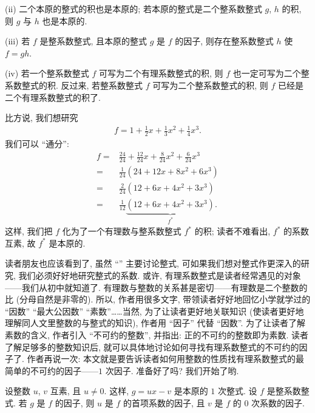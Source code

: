 (ii) 二个本原的整式的积也是本原的; 若本原的整式是二个整系数整式 $g$, $h$ 的积, 则 $g$ 与 $h$ 也是本原的.

(iii) 若 $f$ 是整系数整式, 且本原的整式 $g$ 是 $f$ 的因子, 则存在整系数整式 $h$ 使 $f = gh$.

(iv) 若一个整系数整式 $f$ 可写为二个有理系数整式的积, 则 $f$ 也一定可写为二个整系数整式的积. 反过来, 若整系数整式 $f$ 可写为二个整系数整式的积, 则 $f$ 已经是二个有理系数整式的积了.

比方说, 我们想研究
\begin{align*}
    f = 1 + \frac{1}{2}x + \frac{1}{3}x^2 + \frac{1}{4}x^3.
\end{align*}
我们可以 ``通分'':
\begin{align*}
    f
    = {} & \frac{24}{24} + \frac{12}{24} x + \frac{8}{24} x^2 + \frac{6}{24} x^3 \\
    = {} & \frac{1}{24} (24 + 12x + 8x^2 + 6x^3)                                 \\
    = {} & \frac{2}{24} (12 + 6x + 4x^2 + 3x^3)                                  \\
    = {} & \frac{1}{12} \underbrace{(12 + 6x + 4x^2 + 3x^3)}_{f^{\ast}}.
\end{align*}
这样, 我们把 $f$ 化为了一个有理数与整系数整式 $f^{\ast}$ 的积; 读者不难看出, $f^{\ast}$ 的系数互素, 故 $f^{\ast}$ 是本原的.

读者朋友也应该看到了, 虽然 ``\HEADING '' 主要讨论整式, 可如果我们想对整式作更深入的研究, 我们必须好好地研究整式的系数. 或许, 有理系数整式是读者经常遇见的对象——我们从初中就知道了. 有理数与整数的关系甚是密切——有理数是二个整数的比 (分母自然是非零的). 所以, 作者用很多文字, 带领读者好好地回忆小学就学过的 ``因数'' ``最大公因数'' ``素数''……当然, 为了让读者更好地关联知识 (使读者更好地理解同人文里整数的与整式的知识), 作者用 ``因子'' 代替 ``因数''. 为了让读者了解素数的含义, 作者引入 ``不可约的整数'', 并指出: 正的不可约的整数即为素数. 读者了解足够多的整数知识后, 就可以具体地讨论如何寻找有理系数整式的不可约的因子了. 作者再说一次: 本文就是要告诉读者如何用整数的性质找有理系数整式的最简单的不可约的因子——$1$ 次因子. 准备好了吗? 我们开始了哟.

\begin{proposition}
    设整数 $u$, $v$ 互素, 且 $u \neq 0$. 这样, $g = ux - v$ 是本原的 $1$ 次整式. 设 $f$ 是整系数整式. 若 $g$ 是 $f$ 的因子, 则 $u$ 是 $f$ 的首项系数的因子, 且 $v$ 是 $f$ 的 $0$ 次系数的因子.
\end{proposition}

